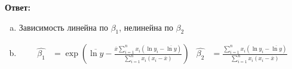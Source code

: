 \documentclass[12pt,letterpaper]{article}
\begin{document}
\textbf{Ответ:}
\begin{enumerate} [a)]
    \item Зависимость линейна по $\beta_1$, нелинейна по $\beta_2$
    \item 
    \begin{align*}
        \hat{\beta_1} &= \exp{\left(\overline{\ln{y}} - \frac{\overline{x}\sum\limits_{i=1}^{n}x_i(\ln{y_i}-\overline{\ln{y}})}{\sum\limits_{i=1}^{n}x_i(x_i - \overline{x})}\right)} &
        \hat{\beta_2} &= \frac{\sum\limits_{i=1}^{n}x_i(\ln{y_i}-\overline{\ln{y}})}{\sum\limits_{i=1}^{n}x_i(x_i - \overline{x})}        
    \end{align*}
\end{enumerate}
\end{document}
